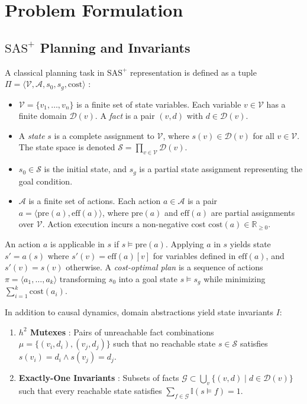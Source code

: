 \documentclass[twocolumn,10pt]{article}
\begin{document}
\section{Problem Formulation}

\subsection{$\text{SAS}^+$ Planning and Invariants}
A classical planning task in $\text{SAS}^+$ representation is defined as a tuple $\Pi = \langle \mathcal{V}, \mathcal{A}, s_0, s_g, \text{cost} \rangle$ \cite{kissmann2014bdd}:
\begin{itemize}
    \item $\mathcal{V} = \{v_1, \dots, v_n\}$ is a finite set of state variables. Each variable $v \in \mathcal{V}$ has a finite domain $\mathcal{D}(v)$. A \emph{fact} is a pair $(v, d)$ with $d \in \mathcal{D}(v)$.
    \item A \emph{state} $s$ is a complete assignment to $\mathcal{V}$, where $s(v) \in \mathcal{D}(v)$ for all $v \in \mathcal{V}$. The state space is denoted $\mathcal{S} = \prod_{v \in \mathcal{V}} \mathcal{D}(v)$.
    \item $s_0 \in \mathcal{S}$ is the initial state, and $s_g$ is a partial state assignment representing the goal condition.
    \item $\mathcal{A}$ is a finite set of actions. Each action $a \in \mathcal{A}$ is a pair $a = \langle \text{pre}(a), \text{eff}(a) \rangle$, where $\text{pre}(a)$ and $\text{eff}(a)$ are partial assignments over $\mathcal{V}$. Action execution incurs a non-negative cost $\text{cost}(a) \in \mathbb{R}_{\ge 0}$.
\end{itemize}

\noindent An action $a$ is applicable in $s$ if $s \models \text{pre}(a)$. Applying $a$ in $s$ yields state $s' = a(s)$ where $s'(v) = \text{eff}(a)[v]$ for variables defined in $\text{eff}(a)$, and $s'(v) = s(v)$ otherwise. A \emph{cost-optimal plan} is a sequence of actions $\pi = \langle a_1, \dots, a_k \rangle$ transforming $s_0$ into a goal state $s \models s_g$ while minimizing $\sum_{i=1}^k \text{cost}(a_i)$.

In addition to causal dynamics, domain abstractions yield state invariants $I$:
\begin{enumerate}
    \item \textbf{$h^2$ Mutexes} \cite{torralba2013constrained}: Pairs of unreachable fact combinations $\mu = \{(v_i, d_i), (v_j, d_j)\}$ such that no reachable state $s \in \mathcal{S}$ satisfies $s(v_i) = d_i \land s(v_j) = d_j$.
    \item \textbf{Exactly-One Invariants} \cite{torralba2013constrained}: Subsets of facts $\mathcal{G} \subset \bigcup_{v} \{(v,d) \mid d \in \mathcal{D}(v)\}$ such that every reachable state satisfies $\sum_{f \in \mathcal{G}} \mathbb{I}(s \models f) = 1$.
\end{enumerate}
\end{document}
